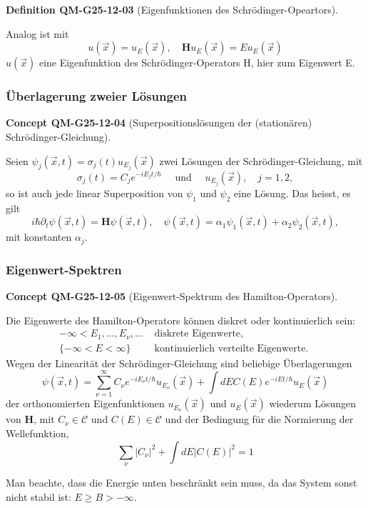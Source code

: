 \documentclass[10pt, letterpaper]{article}
\newcommand{\CustomHeading}[3]{%
  \par\medskip\noindent%
  \textbf{#1 #2} \textnormal{(#3)}.\enskip%
}
\newenvironment{DEF}[2]{\begin{unitbox}\CustomHeading{Definition}{#1}{#2}}{\end{unitbox}}
\newenvironment{CONC}[2]{\begin{unitbox}\CustomHeading{Concept}{#1}{#2}}{\end{unitbox}}
\begin{document}
\begin{DEF}{QM-G25-12-03}{Eigenfunktionen des Schrödinger-Opeartors}
Analog ist mit
$$
u(\vec{x})=u_{E}(\vec{x}), \quad \mathbf{H} u_{E}(\vec{x})=E u_{E}(\vec{x})
$$
$u(\vec{x})$ eine Eigenfunktion des Schrödinger-Operators H, hier zum Eigenwert E.
\end{DEF}



\subsubsection*{Überlagerung zweier Lösungen}


\begin{CONC}{QM-G25-12-04}{Superpositionslösungen der (stationären) Schrödinger-Gleichung}
Seien $\psi_{j}(\vec{x}, t)=\sigma_{j}(t) u_{E_{j}}(\vec{x})$ zwei Lösungen der Schrödinger-Gleichung, mit
$$
\sigma_{j}(t)=C_{j} e^{-i E_{j} t / \hbar} \quad \text { und } \quad u_{E_{j}}(\vec{x}), \quad j=1,2,
$$
so ist auch jede linear Superposition von $\psi_{1}$ und $\psi_{2}$ eine Lösung. Das heisst, es gilt
$$
i \hbar \partial_{t} \psi(\vec{x}, t)=\mathbf{H} \psi(\vec{x}, t), \quad \psi(\vec{x}, t)=\alpha_{1} \psi_{1}(\vec{x}, t)+\alpha_{2} \psi_{2}(\vec{x}, t),
$$
mit konstanten $\alpha_{j}$.
\end{CONC}


\subsubsection*{Eigenwert-Spektren}


\begin{CONC}{QM-G25-12-05}{Eigenwert-Spektrum des Hamilton-Operators}
Die Eigenwerte des Hamilton-Operators können diskret oder kontinuierlich sein:
$$
\begin{aligned}
-\infty<E_{1}, \ldots, E_{\nu}, \ldots & \text { diskrete Eigenwerte, } \\
\{-\infty<E<\infty\} & \text { kontinuierlich verteilte Eigenwerte. }
\end{aligned}
$$
Wegen der Linearität der Schrödinger-Gleichung sind beliebige Überlagerungen
$$
\psi(\vec{x}, t)=\sum_{\nu=1}^{\infty} C_{\nu} e^{-i E_{\nu} t / \hbar} u_{E_{\nu}}(\vec{x})+\int d E C(E) e^{-i E t / \hbar} u_{E}(\vec{x})
$$
der orthonomierten Eigenfunktionen $u_{E_{\nu}}(\vec{x})$ und $u_{E}(\vec{x})$ wiederum Lösungen von $\mathbf{H}$, mit $C_{\nu} \in \mathcal{C}$ und $C(E) \in \mathcal{C}$ und der Bedingung für die Normierung der Wellefunktion,
$$
\sum_{\nu}\left|C_{\nu}\right|^{2}+\int d E|C(E)|^{2}=1
$$

Man beachte, dass die Energie unten beschränkt sein muss, da das System sonst nicht stabil ist: $E \geq B>-\infty$.
\end{CONC}
\end{document}
